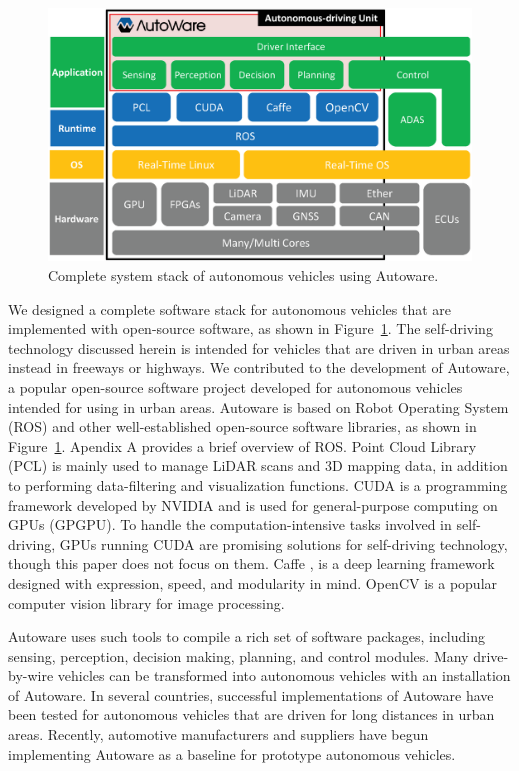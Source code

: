 \begin{figure}[!htbp]
  \centering
  \includegraphics[width=0.9\linewidth]{../figure/Autoware/system_stack.eps}
  \caption{\label{fig:system_stack}
  Complete system stack of autonomous vehicles using Autoware.}
\end{figure}

We designed a complete software stack for autonomous vehicles that are implemented with open-source software, as shown in
Figure~\ref{fig:system_stack}.
The self-driving technology discussed herein is intended for vehicles that are driven in
urban areas instead in freeways or highways.
We contributed to the development of Autoware, a popular
open-source software project developed for autonomous
vehicles intended for using in urban areas.
Autoware is based on Robot Operating System (ROS) and other
well-established open-source software libraries, as shown in
Figure~\ref{fig:system_stack}.
Apendix A provides a brief overview of ROS.
Point Cloud Library (PCL) \cite{pcl} is mainly used to manage LiDAR
scans and 3D mapping data, in addition to performing data-filtering and visualization functions.
CUDA \cite{cuda} is a programming framework developed by NVIDIA and is used for general-purpose
computing on GPUs (GPGPU).
To handle the computation-intensive tasks involved in self-driving, GPUs running CUDA are
promising solutions for self-driving technology, though this paper does
not focus on them.
Caffe \cite{jia2014caffe}, \cite{caffe} is a deep learning
framework designed with expression, speed, and modularity in mind.
OpenCV \cite{opencv} is a popular computer vision library for image
processing.

Autoware uses such tools to compile a rich set of software packages, including sensing,
perception, decision making, planning, and control modules.
Many drive-by-wire vehicles can be transformed into autonomous vehicles
with an installation of Autoware.
In several countries, successful implementations of Autoware have been tested for
autonomous vehicles that are driven for long distances in urban
areas.
Recently, automotive manufacturers and suppliers have begun
implementing Autoware as a baseline for prototype autonomous vehicles.


